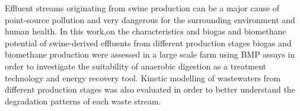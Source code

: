 Effluent streams originating from swine production can be a major cause of point-source pollution and very dangerous for the surrounding environment and human health. In this work,on the characteristics and biogas and biomethane potential of swine-derived effluents from different production stages biogas and biomethane production were assessed in a large scale farm using BMP assays in order to investigate the suitability of anaerobic digestion as a treatment technology and energy recovery tool. Kinetic modelling of wastewaters from different production stages was also evaluated in order to better understand the degradation patterns of each waste stream.